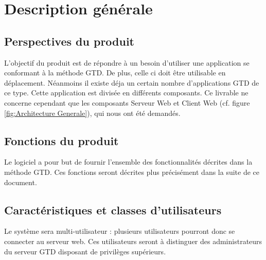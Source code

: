 \chapter{Description générale}

	\section{Perspectives du produit}
L'objectif du produit est de répondre à un besoin d'utiliser une application se conformant à la méthode GTD. De plus, celle ci doit être utilisable en déplacement. Néanmoins il existe déja un certain nombre d'applications GTD de ce type. Cette application est divisée en différents composants. Ce livrable ne concerne cependant que les composants Serveur Web et Client Web (cf. figure \ref{fig:Architecture Generale}), qui nous ont été demandés.


	\section{Fonctions du produit}
Le logiciel a pour but de fournir l'ensemble des fonctionnalités décrites dans la méthode GTD. Ces fonctions seront décrites plus précisément dans la suite de ce document.
	
	\section{Caractéristiques et classes d'utilisateurs}
Le système sera multi-utilisateur : plusieurs utilisateurs pourront donc se connecter au serveur web. Ces utilisateurs seront à distinguer des administrateurs du serveur GTD disposant de privilèges supérieurs.


